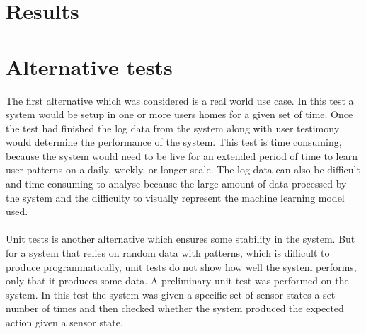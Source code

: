 \section{Results}



\section{Alternative tests}
The first alternative which was considered is a real world use case. In this test a system would be setup in one or more users homes for a given set of time. Once the test had finished the log data from the system along with user testimony would determine the performance of the system. This test is time consuming, because the system would need to be live for an extended period of time to learn user patterns on a daily, weekly, or longer scale. The log data can also be difficult and time consuming to analyse because the large amount of data processed by the system and the difficulty to visually represent the machine learning model used.
\\\\
Unit tests is another alternative which ensures some stability in the system. But for a system that relies on random data with patterns, which is difficult to produce programmatically, unit tests do not show how well the system performs, only that it produces some data. A preliminary unit test was performed on the system. In this test the system was given a specific set of sensor states a set number of times and then checked whether the system produced the expected action given a sensor state.
